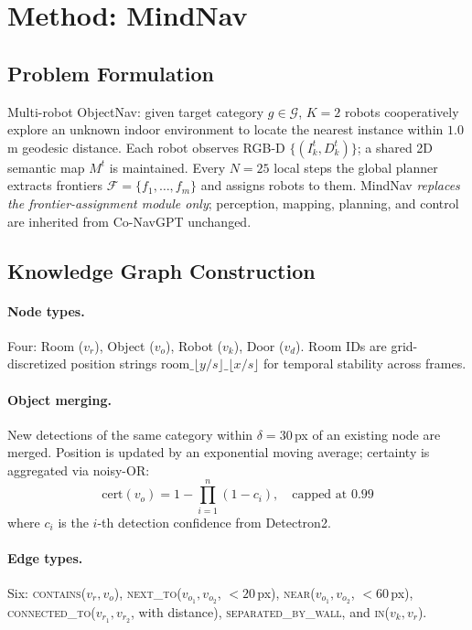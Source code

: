 \section{Method: MindNav}

\subsection{Problem Formulation}
Multi-robot ObjectNav: given target category $g\in\mathcal{G}$, $K{=}2$ robots
cooperatively explore an unknown indoor environment to locate the nearest
instance within $1.0$\,m geodesic distance. Each robot observes RGB-D
$\{(I_k^t,D_k^t)\}$; a shared 2D semantic map $M^t$ is maintained. Every
$N{=}25$ local steps the global planner extracts frontiers
$\mathcal{F}=\{f_1,\ldots,f_m\}$ and assigns robots to them. MindNav
\emph{replaces the frontier-assignment module only}; perception, mapping,
planning, and control are inherited from Co-NavGPT unchanged.

\subsection{Knowledge Graph Construction}

\paragraph{Node types.} Four: Room ($v_r$), Object ($v_o$), Robot ($v_k$),
Door ($v_d$). Room IDs are grid-discretized position strings
$\text{room}\_{\lfloor y/s\rfloor}\_{\lfloor x/s\rfloor}$ for temporal
stability across frames.

\paragraph{Object merging.} New detections of the same category within
$\delta{=}30$\,px of an existing node are merged. Position is updated by an
exponential moving average; certainty is aggregated via noisy-OR:
\begin{equation}
\text{cert}(v_o)=1-\prod_{i=1}^{n}(1-c_i),\quad\text{capped at }0.99
\end{equation}
where $c_i$ is the $i$-th detection confidence from Detectron2.

\paragraph{Edge types.} Six: \textsc{contains}($v_r,v_o$),
\textsc{next\_to}($v_{o_1},v_{o_2}$, $<20$\,px),
\textsc{near}($v_{o_1},v_{o_2}$, $<60$\,px),
\textsc{connected\_to}($v_{r_1},v_{r_2}$, with distance),
\textsc{separated\_by\_wall}, and \textsc{in}($v_k,v_r$).

